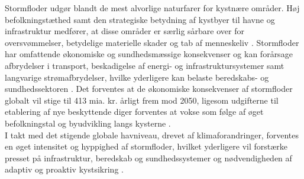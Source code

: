 
Stormfloder udgør blandt de mest alvorlige naturfarer for kystnære områder. Høj befolkningstæthed samt den strategiske betydning af kystbyer til havne og infrastruktur medfører, at disse områder er særlig sårbare over for oversvømmelser, betydelige materielle skader og tab af menneskeliv \citep{kaniewski_solar_2016}. Stormfloder har omfattende økonomiske og sundhedsmæssige konsekvenser og kan forårsage afbrydelser i transport, beskadigelse af energi- og infrastruktursystemer samt langvarige strømafbrydelser, hvilke yderligere kan belaste beredskabs- og sundhedssektoren \citep{lane_health_2013}. Det forventes at de økonomiske konsekvenser af stormfloder globalt vil stige til 413 mia. kr. årligt frem mod 2050, ligesom udgifterne til etablering af nye beskyttende diger forventes at vokse som følge af øget befolkningstal og byudvikling langs kysterne \citep{prahl_damage_2018,hallegatte_future_2013}.\\
I takt med det stigende globale havniveau, drevet af klimaforandringer, forventes en øget intensitet og hyppighed af stormfloder, hvilket yderligere vil forstærke presset på infrastruktur, beredskab og sundhedssystemer og nødvendigheden af adaptiv og proaktiv kystsikring \citep{marsooli_climate_2019, dedekorkut-howes_when_2020}. \\

